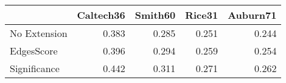 \begin{tabular}{lrrrr}
\toprule
{} & Caltech36 & Smith60 & Rice31 & Auburn71 \\
\midrule
No Extension &     0.383 &   0.285 &  0.251 &    0.244 \\
EdgesScore   &     0.396 &   0.294 &  0.259 &    0.254 \\
Significance &     0.442 &   0.311 &  0.271 &    0.262 \\
\bottomrule
\end{tabular}
